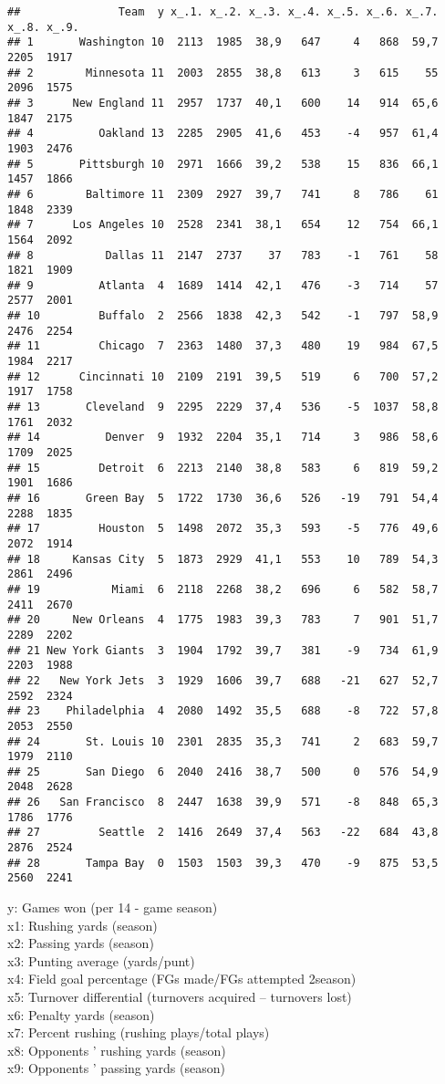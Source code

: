 \documentclass[
]{article}
\begin{document}
\begin{verbatim}
##               Team  y x_.1. x_.2. x_.3. x_.4. x_.5. x_.6. x_.7. x_.8. x_.9.
## 1       Washington 10  2113  1985  38,9   647     4   868  59,7  2205  1917
## 2        Minnesota 11  2003  2855  38,8   613     3   615    55  2096  1575
## 3      New England 11  2957  1737  40,1   600    14   914  65,6  1847  2175
## 4          Oakland 13  2285  2905  41,6   453    -4   957  61,4  1903  2476
## 5       Pittsburgh 10  2971  1666  39,2   538    15   836  66,1  1457  1866
## 6        Baltimore 11  2309  2927  39,7   741     8   786    61  1848  2339
## 7      Los Angeles 10  2528  2341  38,1   654    12   754  66,1  1564  2092
## 8           Dallas 11  2147  2737    37   783    -1   761    58  1821  1909
## 9          Atlanta  4  1689  1414  42,1   476    -3   714    57  2577  2001
## 10         Buffalo  2  2566  1838  42,3   542    -1   797  58,9  2476  2254
## 11         Chicago  7  2363  1480  37,3   480    19   984  67,5  1984  2217
## 12      Cincinnati 10  2109  2191  39,5   519     6   700  57,2  1917  1758
## 13       Cleveland  9  2295  2229  37,4   536    -5  1037  58,8  1761  2032
## 14          Denver  9  1932  2204  35,1   714     3   986  58,6  1709  2025
## 15         Detroit  6  2213  2140  38,8   583     6   819  59,2  1901  1686
## 16       Green Bay  5  1722  1730  36,6   526   -19   791  54,4  2288  1835
## 17         Houston  5  1498  2072  35,3   593    -5   776  49,6  2072  1914
## 18     Kansas City  5  1873  2929  41,1   553    10   789  54,3  2861  2496
## 19           Miami  6  2118  2268  38,2   696     6   582  58,7  2411  2670
## 20     New Orleans  4  1775  1983  39,3   783     7   901  51,7  2289  2202
## 21 New York Giants  3  1904  1792  39,7   381    -9   734  61,9  2203  1988
## 22   New York Jets  3  1929  1606  39,7   688   -21   627  52,7  2592  2324
## 23    Philadelphia  4  2080  1492  35,5   688    -8   722  57,8  2053  2550
## 24       St. Louis 10  2301  2835  35,3   741     2   683  59,7  1979  2110
## 25       San Diego  6  2040  2416  38,7   500     0   576  54,9  2048  2628
## 26   San Francisco  8  2447  1638  39,9   571    -8   848  65,3  1786  1776
## 27         Seattle  2  1416  2649  37,4   563   -22   684  43,8  2876  2524
## 28       Tampa Bay  0  1503  1503  39,3   470    -9   875  53,5  2560  2241
\end{verbatim}

y: Games won (per 14 - game season)\\
x1: Rushing yards (season)\\
x2: Passing yards (season)\\
x3: Punting average (yards/punt)\\
x4: Field goal percentage (FGs made/FGs attempted 2season)\\
x5: Turnover differential (turnovers acquired -- turnovers lost)\\
x6: Penalty yards (season)\\
x7: Percent rushing (rushing plays/total plays)\\
x8: Opponents ' rushing yards (season)\\
x9: Opponents ' passing yards (season)
\end{document}
